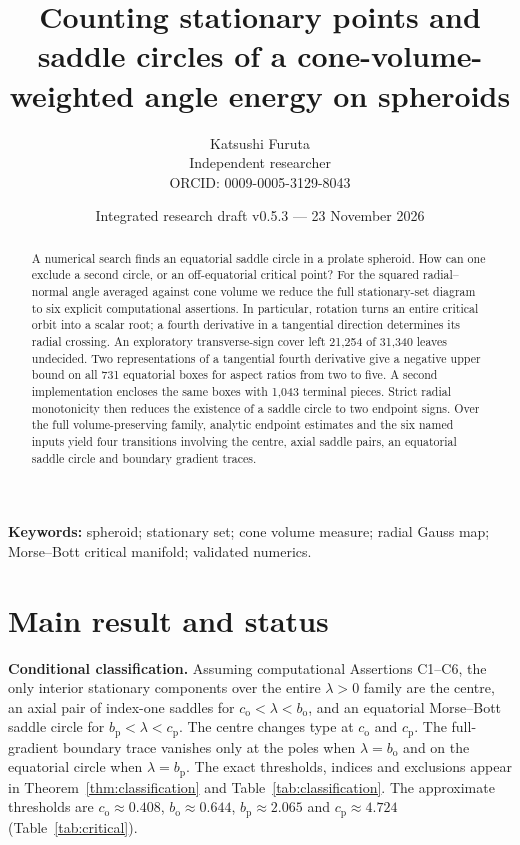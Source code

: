 \documentclass[11pt,a4paper]{article}
\title{Counting stationary points and saddle circles of a cone-volume-weighted angle energy on spheroids}
\author{Katsushi Furuta\\Independent researcher\\\small ORCID: 0009-0005-3129-8043}
\date{Integrated research draft v0.5.3 --- 23 November 2026}
\numberwithin{equation}{section}
\theoremstyle{definition}
\theoremstyle{remark}
\newcommand{\cO}{c_{\mathrm o}}
\newcommand{\bO}{b_{\mathrm o}}
\newcommand{\cP}{c_{\mathrm p}}
\newcommand{\bP}{b_{\mathrm p}}
\begin{document}
\maketitle
\begin{abstract}
A numerical search finds an equatorial saddle circle in a prolate spheroid. How can one exclude a second circle, or an off-equatorial critical point? For the squared radial--normal angle averaged against cone volume we reduce the full stationary-set diagram to six explicit computational assertions. In particular, rotation turns an entire critical orbit into a scalar root; a fourth derivative in a tangential direction determines its radial crossing. An exploratory transverse-sign cover left 21,254 of 31,340 leaves undecided. Two representations of a tangential fourth derivative give a negative upper bound on all 731 equatorial boxes for aspect ratios from two to five. A second implementation encloses the same boxes with 1,043 terminal pieces. Strict radial monotonicity then reduces the existence of a saddle circle to two endpoint signs. Over the full volume-preserving family, analytic endpoint estimates and the six named inputs yield four transitions involving the centre, axial saddle pairs, an equatorial saddle circle and boundary gradient traces.
\end{abstract}
\noindent\textbf{Keywords:} spheroid; stationary set; cone volume measure; radial Gauss map; Morse--Bott critical manifold; validated numerics.

\section*{Main result and status}
\noindent\textbf{Conditional classification.}
Assuming computational Assertions C1--C6, the only interior stationary
components over the entire $\lambda>0$ family are the centre, an axial pair
of index-one saddles for $\cO<\lambda<\bO$, and an equatorial
Morse--Bott saddle circle for $\bP<\lambda<\cP$.
The centre changes type at $\cO$ and $\cP$.
The full-gradient boundary trace vanishes only at the poles when
$\lambda=\bO$ and on the equatorial circle when $\lambda=\bP$.
The exact thresholds, indices and exclusions appear in
Theorem~\ref{thm:classification} and Table~\ref{tab:classification}.
The approximate thresholds are $\cO\approx0.408$, $\bO\approx0.644$,
$\bP\approx2.065$ and $\cP\approx4.724$ (Table~\ref{tab:critical}).
\end{document}
